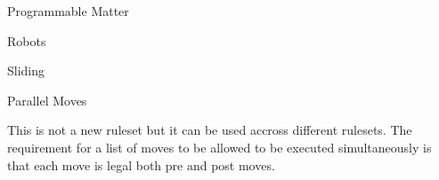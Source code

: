 \documentclass[12pt, letterpaper]{article}
\begin{document}
\begin{section}{Programmable Matter}
\begin{subsection}{Robots}
\begin{subsubsection}{Sliding}
    \end{subsubsection}

    \begin{subsubsection}{Parallel Moves}

      This is not a new ruleset but it can be used accross different rulesets.
      The requirement for a list of moves to be allowed to be executed
      simultaneously is that each move is legal both pre and post moves.

    \end{subsubsection}

  \end{subsection}

\end{section}
\end{document}

